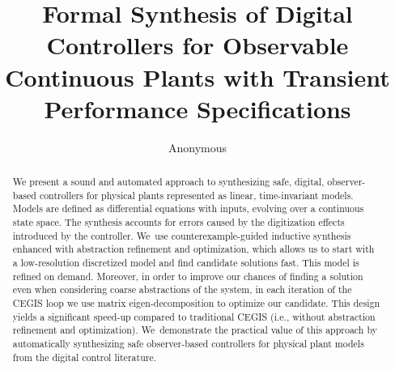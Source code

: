 \documentclass[sigconf]{llncs}
\begin{document}
\title{Formal Synthesis of Digital Controllers for Observable Continuous
Plants with Transient Performance Specifications}

\author{Anonymous%
}%

\institute{%
}


\maketitle


\begin{abstract} 
%
We present a sound and automated approach to synthesizing safe, digital,
observer-based controllers for physical plants represented as linear,
time-invariant models.  Models are defined as differential equations with
inputs, evolving over a continuous state space.  The synthesis accounts for
errors caused by the digitization effects introduced by the controller. 
We~use counterexample-guided inductive synthesis enhanced with abstraction
refinement and optimization, which allows us to start with a low-resolution
discretized model and find candidate solutions fast.  This model is refined
on demand.  Moreover, in order to improve our chances of finding a solution
even when considering coarse abstractions of the system, in each iteration
of the CEGIS loop we use matrix eigen-decomposition to optimize our
candidate.
%
%
This design yields a significant speed-up compared to traditional CEGIS
(i.e., without abstraction refinement and optimization).  We~demonstrate the
practical value of this approach by automatically synthesizing safe
observer-based controllers for physical plant models from the digital
control literature.
%
\end{abstract}
\end{document}
